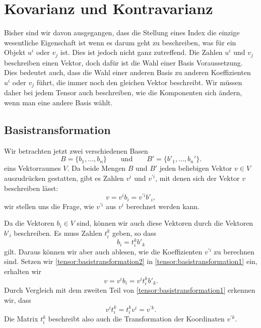%
%
%
\section{Kovarianz und Kontravarianz}
Bisher sind wir davon ausgegangen, dass die Stellung eines Index die
einzige wesentliche Eigenschaft ist wenn es darum geht zu beschreiben,
was für ein Objekt $u^i$ oder $v_j$ ist.
Dies ist jedoch nicht ganz zutreffend.
Die Zahlen $u^i$ und $v_j$ beschreiben einen Vektor, doch dafür ist
die Wahl einer Basis Voraussetzung.
Dies bedeutet auch, dass die Wahl einer anderen Basis zu anderen
Koeffizienten $u^i$ oder $v_j$ führt, die immer noch den gleichen
Vektor beschreibt.
Wir müssen daher bei jedem Tensor auch beschreiben, wie die Komponenten
sich ändern, wenn man eine andere Basis wählt.

\subsection{Basistransformation}
Wir betrachten jetzt zwei verschiedenen Basen
\[
B=\{b_1,\dots,b_n\}
\qquad\text{und}\qquad
B'=\{b'_1,\dots,b_n'\}.
\]
eins Vektorraumes $V$.
Da beide Mengen $B$ und $B'$ jeden beliebigen Vektor $v\in V$ auszudrücken
gestatten, gibt es Zahlen $v^i$ und $v^{\prime i}$, mit denen sich der Vektor
$v$ beschreiben lässt:
\begin{equation}
v = v^ib_i = v^{\prime i}b'_i,
\label{tensor:basistransformation1}
\end{equation}
wir stellen uns die Frage, wie $v^{\prime i}$ aus $v^i$ berechnet
werden kann.

Da die Vektoren $b_i\in V$ sind, können wir auch diese Vektoren durch
die Vektoren $b'_i$ beschreiben.
Es muss Zahlen $t^k_i$ geben, so dass
\begin{equation}
b_i = t_i^k b'_k
\label{tensor:basistransformation2}
\end{equation}
gilt.
Daraus können wir aber auch ablesen, wie die Koeffizienten $v^{\prime i}$
zu berechnen sind.
Setzen wir \eqref{tensor:basistransformation2} in
\eqref{tensor:basistransformation1} ein, erhalten wir
\begin{equation}
v = v^i b_i = v^i t_i^kb'_k.
\end{equation}
Durch Vergleich mit dem zweiten Teil von \eqref{tensor:basistransformation1}
erkennen wir, dass 
\begin{equation}
v^i t_i^k
=
t_i^k v^i
=
v^{\prime k}.
\label{tensor:basistransformation3}
\end{equation}
Die Matrix $t_i^k$ beschreibt also auch die Transformation der Koordinaten
$v^{\prime k}$.

